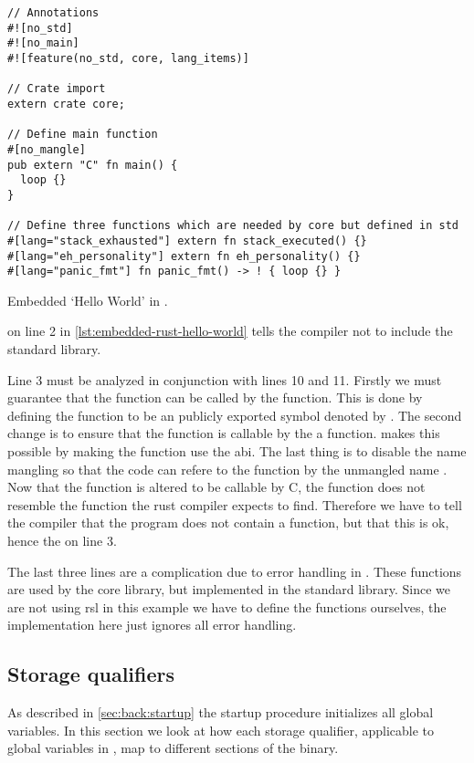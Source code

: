 \begin{listing}[H]
  \begin{verbatim}
// Annotations
#![no_std]
#![no_main]
#![feature(no_std, core, lang_items)]

// Crate import
extern crate core;

// Define main function
#[no_mangle]
pub extern "C" fn main() {
  loop {}
}

// Define three functions which are needed by core but defined in std
#[lang="stack_exhausted"] extern fn stack_executed() {}
#[lang="eh_personality"] extern fn eh_personality() {}
#[lang="panic_fmt"] fn panic_fmt() -> ! { loop {} }
\end{verbatim}
\caption{Embedded `Hello World' in {\rust}.}
\label{lst:embedded-rust-hello-world}
\end{listing}

\attrib{\#\![no\_std]} on line 2 in \autoref{lst:embedded-rust-hello-world} tells the {\rust} compiler not to include the standard library.

Line 3 must be analyzed in conjunction with lines 10 and 11.
Firstly we must guarantee that the function can be called by the  function.
This is done by defining the {\main} function to be an publicly exported symbol denoted by .
The second change is to ensure that the function is callable by the a {\C} function.
 makes this possible by making the function use the {\C} \gls{abi}.
The last thing is to disable the {\rust} name mangling so that the {\C} code can refere to the function by the unmangled name {\main}.
Now that the {\main} function is altered to be callable by C, the function does not resemble the function the rust compiler expects to find.
Therefore we have to tell the compiler that the program does not contain a {\main} function, but that this is ok, hence the \attrib{\#\![no\_main]} on line 3.

The last three lines are a complication due to error handling in {\rust}.
These functions are used by the core library, but implemented in the standard library.
Since we are not using \gls{rsl} in this example we have to define the functions ourselves, the implementation here just ignores all error handling.

\subsection{Storage qualifiers}

As described in \autoref{sec:back:startup} the startup procedure initializes all global variables.
In this section we look at how each storage qualifier,  applicable to global variables in {\rust}, map to different sections of the {\elf} binary.

